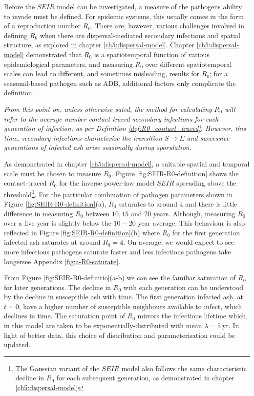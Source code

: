Before the $SEIR$ model can be investigated, a measure of the pathogens ability to invade must be defined. For epidemic systems, this usually comes in the form of a reproduction number $R_0$. There are, however, various challenges involved in defining $R_0$ when there are dispersal-mediated secondary infections and spatial structure, as explored in chapter \ref{ch5:dispersal-model}. Chapter \ref{ch5:dispersal-model} demonstrated that $R_0$ is a spatiotemporal function of various epidemiological parameters, and measuring $R_0$ over different spatiotemporal scales can lead to different, and sometimes misleading, results for $R_0$; for a seasonal-based pathogen such as ADB, additional factors only complicate the definition. 

\textit{From this point on, unless otherwise sated, the method for calculating $R_0$ will refer to the average number contact traced secondary infections for each generation of infection, as per Definition \ref{def:R0_contact_traced}. However, this time, secondary infections characterise the transition $S\rightarrow E$ and successive generations of infected ash arise seasonally during sporulation.}

As demonstrated in chapter \ref{ch5:dispersal-model}, a suitable spatial and temporal scale must be chosen to measure $R_0$. Figure \ref{fig:SEIR-R0-definition} shows the contact-traced $R_0$ for the inverse power-law model $SEIR$ spreading above the threshold\footnote{The Gaussian variant of the $SEIR$ model also follows the same characteristic decline in $R_0$ for each subsequent generation, as demonstrated in chapter \ref{ch5:dispersal-model}}. For the particular combination of pathogen parameters shown in Figure \ref{fig:SEIR-R0-definition}(a), $R_0$ saturates to around $4$ and there is little difference in measuring $R_0$ between $10, 15$ and $20$ years. Although, measuring $R_0$ over a five year is slightly below the $10-20$ year average. This behaviour is also reflected in Figure \ref{fig:SEIR-R0-definition}(b) where $R_0$ for the first generation infected ash saturates at around $R_0 = 4$. On average, we would expect to see more infectious pathogens saturate faster and less infectious pathogens take longer\textemdash see Appendix \ref{fig:a-R0-saturate}.

From Figure \ref{fig:SEIR-R0-definitio}(a-b) we can see the familiar saturation of $R_0$ for later generations. The decline in $R_0$ with each generation can be understood by the decline in susceptible ash with time. The first generation infected ash, at $t=0$, have a higher number of susceptible neighbours available to infect, which declines in time. The saturation point of $R_0$ mirrors the infectious lifetime which, in this model are taken to be exponentially-distributed with mean $\lambda=5\ \mathrm{yr}$. In light of better data, this choice of distribution and parameterisation could be updated. 

